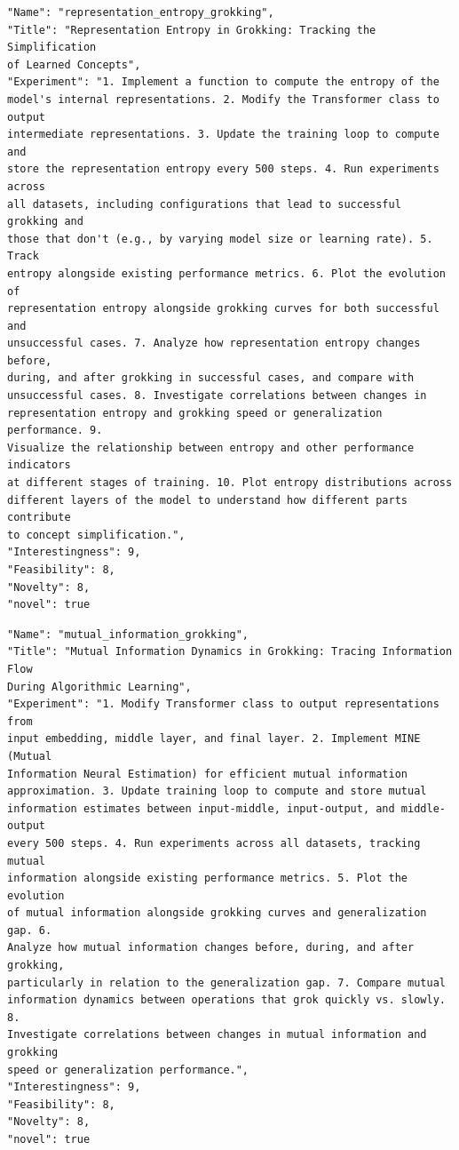 \begin{tcolorbox}[breakable,colback=blue!5!white, colframe=blue!75!black, title=Idea 45/50 - \texttt{representation\_entropy\_grokking}]
\small
\begin{verbatim}
"Name": "representation_entropy_grokking",
"Title": "Representation Entropy in Grokking: Tracking the Simplification
of Learned Concepts",
"Experiment": "1. Implement a function to compute the entropy of the
model's internal representations. 2. Modify the Transformer class to output
intermediate representations. 3. Update the training loop to compute and
store the representation entropy every 500 steps. 4. Run experiments across
all datasets, including configurations that lead to successful grokking and
those that don't (e.g., by varying model size or learning rate). 5. Track
entropy alongside existing performance metrics. 6. Plot the evolution of
representation entropy alongside grokking curves for both successful and
unsuccessful cases. 7. Analyze how representation entropy changes before,
during, and after grokking in successful cases, and compare with
unsuccessful cases. 8. Investigate correlations between changes in
representation entropy and grokking speed or generalization performance. 9.
Visualize the relationship between entropy and other performance indicators
at different stages of training. 10. Plot entropy distributions across
different layers of the model to understand how different parts contribute
to concept simplification.",
"Interestingness": 9,
"Feasibility": 8,
"Novelty": 8,
"novel": true
\end{verbatim}
\end{tcolorbox}

\begin{tcolorbox}[breakable,colback=blue!5!white, colframe=blue!75!black, title=Idea 46/50 - \texttt{mutual\_information\_grokking}]
\small
\begin{verbatim}
"Name": "mutual_information_grokking",
"Title": "Mutual Information Dynamics in Grokking: Tracing Information Flow
During Algorithmic Learning",
"Experiment": "1. Modify Transformer class to output representations from
input embedding, middle layer, and final layer. 2. Implement MINE (Mutual
Information Neural Estimation) for efficient mutual information
approximation. 3. Update training loop to compute and store mutual
information estimates between input-middle, input-output, and middle-output
every 500 steps. 4. Run experiments across all datasets, tracking mutual
information alongside existing performance metrics. 5. Plot the evolution
of mutual information alongside grokking curves and generalization gap. 6.
Analyze how mutual information changes before, during, and after grokking,
particularly in relation to the generalization gap. 7. Compare mutual
information dynamics between operations that grok quickly vs. slowly. 8.
Investigate correlations between changes in mutual information and grokking
speed or generalization performance.",
"Interestingness": 9,
"Feasibility": 8,
"Novelty": 8,
"novel": true
\end{verbatim}
\end{tcolorbox}

